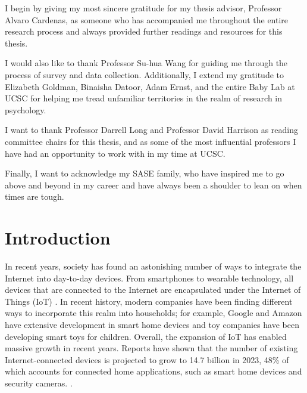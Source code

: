 \documentclass[12pt]{ucthesis}
\begin{document}
\begin{frontmatter}
\begin{acknowledgements}
I begin by giving my most sincere gratitude for my thesis advisor, Professor Alvaro Cardenas, as someone who has accompanied me throughout the entire research process and always provided further readings and resources for this thesis.

I would also like to thank Professor Su-hua Wang for guiding me through the process of survey and data collection. Additionally, I extend my gratitude to Elizabeth Goldman, Binaisha Datoor, Adam Ernst, and the entire Baby Lab at UCSC for helping me tread unfamiliar territories in the realm of research in psychology.

I want to thank Professor Darrell Long and Professor David Harrison as reading committee chairs for this thesis, and as some of the most influential professors I have had an opportunity to work with in my time at UCSC.

Finally, I want to acknowledge my SASE family, who have inspired me to go above and beyond in my career and have always been a shoulder to lean on when times are tough.

\end{acknowledgements}

\end{frontmatter}

\chapter{Introduction}
In recent years, society has found an astonishing number of ways to integrate the Internet into day-to-day devices. From smartphones to wearable technology, all devices that are connected to the Internet are encapsulated under the Internet of Things (IoT) \cite{gubbi:iot}. In recent history, modern companies have been finding different ways to incorporate this realm into households; for example, Google and Amazon have extensive development in smart home devices and toy companies have been developing smart toys for children. Overall, the expansion of IoT has enabled massive growth in recent years. Reports have shown that the number of existing Internet-connected devices is projected to grow to 14.7 billion in 2023, 48\% of which accounts for connected home applications, such as smart home devices and security cameras. \cite{cisco}.
\end{document}
